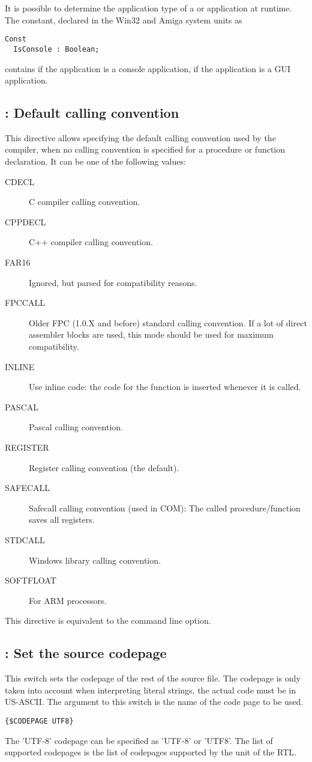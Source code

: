 It is possible to determine the application type of a \windows or \amiga application
at runtime. The  constant, declared in the Win32 and Amiga
system units as
\begin{verbatim}
Const
  IsConsole : Boolean;
\end{verbatim}
contains  if the application is a console application, 
if the application is a GUI application.

\subsection{ : Default calling convention}
This directive allows specifying the default calling convention used by the
compiler, when no calling convention is specified for a procedure or
function declaration. It can be one of the following values:
\begin{description}
\item[CDECL] C compiler calling convention.
\item[CPPDECL] C++ compiler calling convention.
\item[FAR16] Ignored, but parsed for \tp compatibility reasons.
\item[FPCCALL] Older FPC (1.0.X and before) standard calling convention. If
a lot of direct assembler blocks are used, this mode should be used for
maximum compatibility.
\item[INLINE] Use inline code: the code for the function is inserted
whenever it is called.
\item[PASCAL] Pascal calling convention.
\item[REGISTER] Register calling convention (the default).
\item[SAFECALL] Safecall calling convention (used in COM): The called
procedure/function saves all registers.
\item[STDCALL] Windows library calling convention.
\item[SOFTFLOAT] For ARM processors.
\end{description}
This directive is equivalent to the  command line option.

\subsection{ : Set the source codepage}
This switch sets the codepage of the rest of the source file. 
The codepage is only taken into account when interpreting literal 
strings, the actual code must be in US-ASCII. The argument to this switch is the name of the code page to be used.
\begin{verbatim}
{$CODEPAGE UTF8}
\end{verbatim}
The 'UTF-8' codepage can be specified as 'UTF-8' or 'UTF8'.
The list of supported codepages is the list of codepages
supported by the  unit of the RTL.

